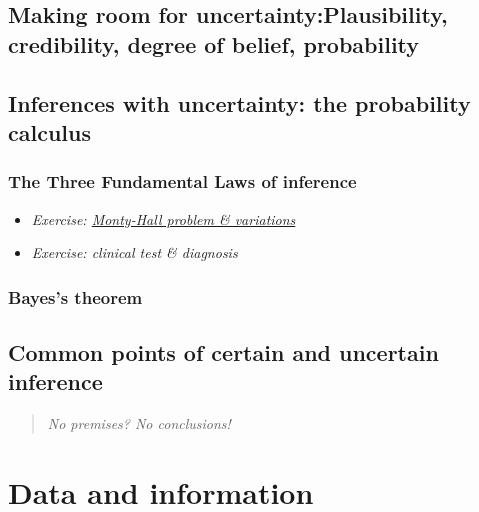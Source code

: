 \documentclass[]{book}
\begin{document}
\hypertarget{making-room-for-uncertainty-plausibility-credibility-degree-of-belief-probability}{%
\section{\texorpdfstring{Making room for uncertainty:Plausibility, credibility, degree of belief, probability}{Making room for uncertainty: Plausibility, credibility, degree of belief, probability}}\label{making-room-for-uncertainty-plausibility-credibility-degree-of-belief-probability}}

\hypertarget{inferences-with-uncertainty-the-probability-calculus}{%
\section{Inferences with uncertainty: the probability calculus}\label{inferences-with-uncertainty-the-probability-calculus}}

\hypertarget{the-three-fundamental-laws-of-inference}{%
\subsection{The Three Fundamental Laws of inference}\label{the-three-fundamental-laws-of-inference}}

\begin{itemize}
\item
  \emph{Exercise: \href{The_Monty_Hall_problem-exercise.pdf}{Monty-Hall problem \& variations}}
\item
  \emph{Exercise: clinical test \& diagnosis}
\end{itemize}

\hypertarget{bayess-theorem}{%
\subsection{Bayes's theorem}\label{bayess-theorem}}

\hypertarget{common-points-of-certain-and-uncertain-inference}{%
\section{Common points of certain and uncertain inference}\label{common-points-of-certain-and-uncertain-inference}}

\begin{quote}
\emph{No premises? No conclusions!}
\end{quote}

\hypertarget{data-and-information}{%
\chapter{Data and information}\label{data-and-information}}
\end{document}
